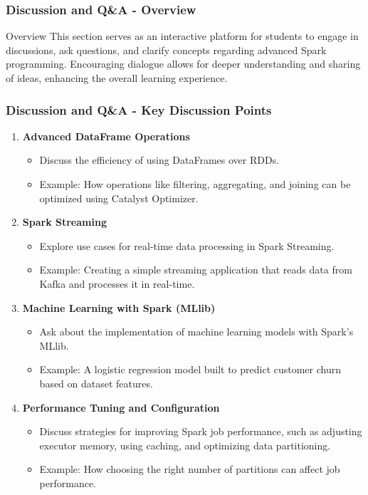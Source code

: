 \documentclass[aspectratio=169]{beamer}
\begin{document}
\begin{frame}[fragile]
    \frametitle{Discussion and Q\&A - Overview}
    \begin{block}{Overview}
        This section serves as an interactive platform for students to engage in discussions, ask questions, and clarify concepts regarding advanced Spark programming.
        Encouraging dialogue allows for deeper understanding and sharing of ideas, enhancing the overall learning experience.
    \end{block}
\end{frame}

\begin{frame}[fragile]
    \frametitle{Discussion and Q\&A - Key Discussion Points}
    \begin{enumerate}
        \item \textbf{Advanced DataFrame Operations}
        \begin{itemize}
            \item Discuss the efficiency of using DataFrames over RDDs.
            \item Example: How operations like filtering, aggregating, and joining can be optimized using Catalyst Optimizer.
        \end{itemize}
        
        \item \textbf{Spark Streaming}
        \begin{itemize}
            \item Explore use cases for real-time data processing in Spark Streaming.
            \item Example: Creating a simple streaming application that reads data from Kafka and processes it in real-time.
        \end{itemize}
        
        \item \textbf{Machine Learning with Spark (MLlib)}
        \begin{itemize}
            \item Ask about the implementation of machine learning models with Spark's MLlib.
            \item Example: A logistic regression model built to predict customer churn based on dataset features.
        \end{itemize}

        \item \textbf{Performance Tuning and Configuration}
        \begin{itemize}
            \item Discuss strategies for improving Spark job performance, such as adjusting executor memory, using caching, and optimizing data partitioning.
            \item Example: How choosing the right number of partitions can affect job performance.
        \end{itemize}


\end{enumerate}
\end{frame}
\end{document}
